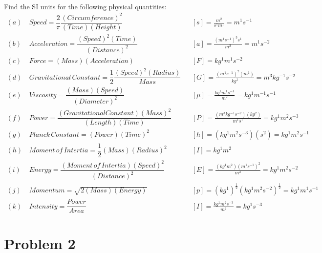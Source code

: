 \documentclass[]{article}
\begin{document}
{		\paragraph{} Find the SI units for the following physical quantities:			
			\begin{equation*}
				\begin{aligned}
					(a) & \, Speed = \dfrac{2}{\pi} \dfrac{(Circumference)^2}{(Time)(Height)}  & &\left[ s \right] = \frac{ m^2 }{ s^1 m^1 } = m^1 s^{-1}
					\\
					(b) & \, Acceleration = \dfrac{(Speed)^2 (Time)}{(Distance)^2} & &\left[ a \right] = \frac{ (m^1 s^{-1})^3 s^1 }{ m^2 } = m^1 s^{-2}
					\\
					(c) & \, Force = (Mass)(Acceleration) & &\left[ F \right] = kg^1 m^1 s^{-2}
					\\
					(d) & \, Gravitational \, Constant = \dfrac{1}{2} \dfrac{(Speed)^2 (Radius)}{Mass}  & &\left[ G \right] = \frac{ (m^1 s^{-1})^2 (m^1) }{ kg^1 } = m^3 kg^{-1} s^{-2}
					\\
					(e) & \, Viscosity = \dfrac{(Mass) (Speed)}{(Diameter)^2} & &\left[ \mu \right] = \frac{ kg^1 m^1 s^{-1} }{ m^2 } = kg^1 m^{-1} s^{-1}
					\\
					(f) & \, Power = \dfrac{(Gravitational Constant) (Mass)^2}{(Length) (Time)} & &\left[ P \right] = \frac{ (m^3 kg^{-1} s^{-2}) (kg^2) }{ m^1 s^1 } = kg^1 m^2 s^{-3}
					\\
					(g) & \, Planck \, Constant = (Power)(Time)^2 & &\left[ h \right] = (kg^1 m^2 s^{-3})(s^2) = kg^1 m^2 s^{-1}
					\\
					(h) & \, Moment \, of \, Intertia = \dfrac{1}{2} (Mass)(Radius)^2 & &\left[ I \right] = kg^1 m^2
					\\
					(i) & \, Energy = \dfrac{(Moment \, of \, Intertia) (Speed)^2}{(Distance)^2}  & &\left[ E \right] = \frac{ (kg^1 m^2) (m^1 s^{-1})^2 }{ m^2 } = kg^1 m^2 s^{-2}
					\\
					(j) & \, Momentum = \sqrt{2(Mass)(Energy)} & &\left[ p \right] = (kg^1)^{\frac{1}{2}} (kg^1 m^2 s^{-2})^{\frac{1}{2}} = kg^1 m^1 s^{-1}
					\\
					(k) & \, Intensity = \dfrac{Power}{Area} & &\left[ I \right] = \frac{ kg^1 m^2 s^{-3} }{ m^2 } = kg^1 s^{-3}
				\end{aligned}
			\end{equation*}

	\section*{Problem 2}

}
\end{document}
